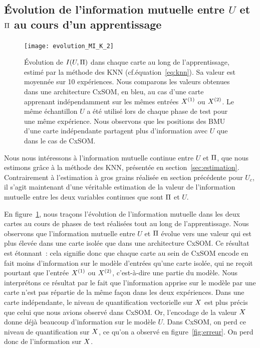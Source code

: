 \documentclass[../main]{subfiles}
\begin{document}
\subsection{\'Evolution de l'information mutuelle entre $U$ et $\Pi$ au cours d'un apprentissage}\label{sec:mi}

\begin{figure}
    \centering\texttt{[image: evolution\_MI\_K\_2]}
    \caption{\'Evolution de $I(U,\Pi)$ dans chaque carte au long de l'apprentissage, estimé par la méthode des KNN (cf.équation~\ref{eq:knn}).
    Sa valeur est moyennée sur 10 expériences. Nous comparons les valeurs obtenues dans une architecture CxSOM, en bleu, au cas d'une carte apprenant indépendamment sur les mêmes entrées $X^{({1})}$ ou $X^{({2})}$.
    Le même échantillon $U$ a été utilisé lors de chaque phase de test pour une même expérience.
    Nous observons que les positions des BMU d'une carte indépendante partagent plus d'information avec $U$ que dans le cas de CxSOM.
    \label{fig:MI_evol_total}}
    \end{figure}

Nous nous intéressons à l'information mutuelle continue entre $U$ et $\Pi$, que nous estimons grâce à la méthode des KNN, présentée en section~\ref{sec:estimation}. Contrairement à l'estimation à gros grains réalisée en section précédente pour $U_c$, il s'agit maintenant d'une véritable estimation de la valeur de l'information mutuelle entre les deux variables continues que sont $\Pi$ et $U$.

En figure~\ref{fig:MI_evol_total}, nous traçons l'évolution de l'information mutuelle dans les deux cartes au cours de phases de test réalisées tout au long de l'apprentissage.
Nous observons que l'information mutuelle entre $U$ et $\Pi$ évolue vers une valeur qui est plus élevée dans une carte isolée que dans une architecture CxSOM.
Ce résultat est étonnant~: cela signifie donc que chaque carte au sein de CxSOM encode en fait moins d'information sur le modèle d'entrées qu'une carte isolée, qui ne reçoit pourtant que l'entrée $X^{({1})}$ ou $X^{({2})}$, c'est-à-dire une partie du modèle.
Nous interprétons ce résultat par le fait que l'information apprise sur le modèle par une carte n'est pas répartie de la même façon dans les deux expériences.
Dans une carte indépendante, le niveau de quantification vectorielle sur $X$ est plus précis que celui que nous avions observé dans CxSOM.
Or, l'encodage de la valeur $X$ donne déjà beaucoup d'information sur le modèle $U$.
Dans CxSOM, on perd ce niveau de quantification sur $X$, ce qu'on a observé en figure~\ref{fig:erreur}. On perd donc de l'information sur $X$.
\end{document}

